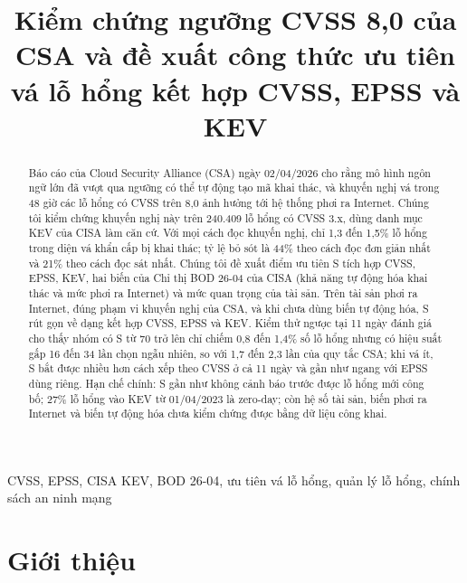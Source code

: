 \documentclass[conference]{IEEEtran}
\begin{document}
\title{Kiểm chứng ngưỡng CVSS 8,0 của CSA và đề xuất công thức ưu tiên vá lỗ hổng kết hợp CVSS, EPSS và KEV}

\author{
}

\maketitle

\begin{abstract}
Báo cáo của Cloud Security Alliance (CSA) ngày 02/04/2026 cho rằng mô hình ngôn ngữ lớn đã
vượt qua ngưỡng có thể tự động tạo mã khai thác, và khuyến nghị vá trong 48 giờ các lỗ hổng có CVSS trên
8,0 ảnh hưởng tới hệ thống phơi ra Internet. Chúng tôi kiểm chứng khuyến nghị này trên 240.409 lỗ hổng có
CVSS 3.x, dùng danh mục KEV của CISA làm căn cứ. Với mọi cách đọc khuyến nghị, chỉ 1,3 đến 1,5\% lỗ
hổng trong diện vá khẩn cấp bị khai thác; tỷ lệ bỏ sót là 44\% theo cách đọc đơn giản nhất và
21\% theo cách đọc sát nhất. Chúng tôi đề xuất điểm ưu tiên S tích hợp CVSS, EPSS, KEV, hai biến của Chỉ thị BOD 26-04 của CISA (khả năng tự động hóa khai thác và mức phơi ra Internet) và mức quan trọng của tài sản. Trên tài sản phơi ra Internet, đúng phạm vi khuyến nghị của CSA, và khi chưa dùng biến tự động hóa, S rút gọn về dạng kết hợp CVSS, EPSS và KEV. Kiểm thử ngược tại 11
ngày đánh giá cho thấy nhóm có S từ 70 trở lên chỉ chiếm 0,8 đến 1,4\% số lỗ hổng nhưng có hiệu suất gấp 16 đến 34 lần chọn ngẫu nhiên, so với 1,7 đến 2,3 lần của quy tắc CSA; khi vá ít, S bắt được nhiều hơn cách xếp theo CVSS ở cả 11 ngày và gần như ngang với EPSS dùng riêng. Hạn chế chính: S gần như không
cảnh báo trước được lỗ hổng mới công bố; 27\% lỗ hổng vào KEV từ 01/04/2023 là zero-day; còn hệ số tài sản, biến phơi ra Internet và biến tự động hóa chưa kiểm chứng được bằng dữ liệu công khai.
\end{abstract}

\begin{IEEEkeywords}
CVSS, EPSS, CISA KEV, BOD 26-04, ưu tiên vá lỗ hổng, quản lý lỗ hổng, chính sách an ninh mạng
\end{IEEEkeywords}

\section{Giới thiệu}
\end{document}

